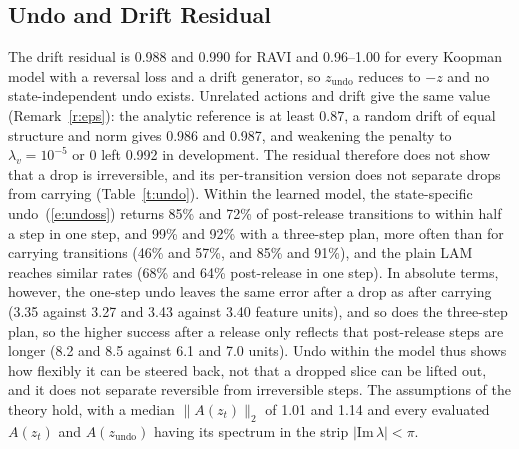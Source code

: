 \documentclass{jcse}
\newcommand{\method}{RAVI}
\newcommand{\zundo}{z_{\mathrm{undo}}}
\begin{document}
\subsection{Undo and Drift Residual}
The drift residual is 0.988 and 0.990 for {\method} and 0.96--1.00 for every Koopman model with a reversal loss and a drift generator, so $\zundo$ reduces to $-z$ and no state-independent undo exists.
Unrelated actions and drift give the same value (Remark~\ref{r:eps}): the analytic reference is at least 0.87, a random drift of equal structure and norm gives 0.986 and 0.987, and weakening the penalty to $\lambda_v=10^{-5}$ or 0 left 0.992 in development.
The residual therefore does not show that a drop is irreversible, and its per-transition version does not separate drops from carrying (Table~\ref{t:undo}).
Within the learned model, the state-specific undo~(\ref{e:undoss}) returns 85\% and 72\% of post-release transitions to within half a step in one step, and 99\% and 92\% with a three-step plan, more often than for carrying transitions (46\% and 57\%, and 85\% and 91\%), and the plain LAM reaches similar rates (68\% and 64\% post-release in one step).
In absolute terms, however, the one-step undo leaves the same error after a drop as after carrying (3.35 against 3.27 and 3.43 against 3.40 feature units), and so does the three-step plan, so the higher success after a release only reflects that post-release steps are longer (8.2 and 8.5 against 6.1 and 7.0 units).
Undo within the model thus shows how flexibly it can be steered back, not that a dropped slice can be lifted out, and it does not separate reversible from irreversible steps.
The assumptions of the theory hold, with a median $\|A(z_t)\|_2$ of 1.01 and 1.14 and every evaluated $A(z_t)$ and $A(\zundo)$ having its spectrum in the strip $|\mathrm{Im}\,\lambda|<\pi$.
\end{document}
